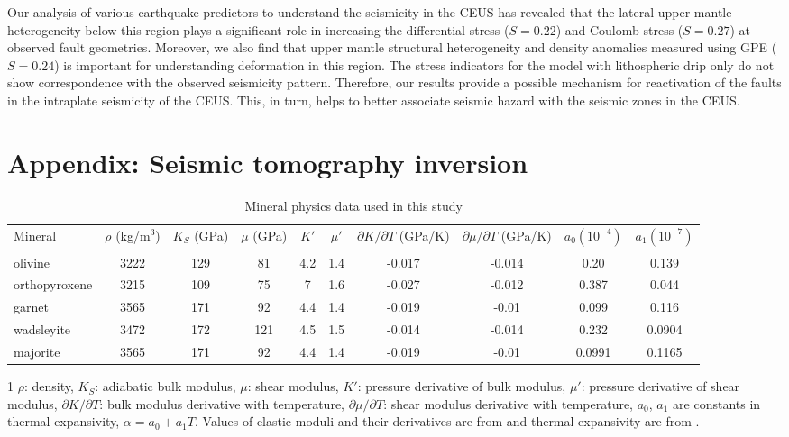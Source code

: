 \documentclass[draft,linenumbers]{agujournal2018}
\begin{document}
Our analysis of various earthquake predictors to understand the seismicity in the CEUS has revealed that the lateral upper-mantle heterogeneity below this region plays a significant role in increasing the differential stress ($S=0.22$) and Coulomb stress ($S=0.27$) at observed fault geometries. Moreover, we also find that upper mantle structural heterogeneity and density anomalies measured using GPE ($S=0.24$) is important for understanding deformation in this region. The stress indicators for the model with lithospheric drip only do not show correspondence with the observed seismicity pattern. Therefore, our results provide a possible mechanism for reactivation of the faults in the intraplate seismicity of the CEUS. This, in turn, helps to better associate seismic hazard with the seismic zones in the CEUS.

\appendix
\section{Appendix: Seismic tomography inversion}


\begin{table}
\caption{Mineral physics data used in this study }
\centering
\begin{tabular}{ l c c c c c c c c c } 
\hline
 \multirow{2}{3em}{Mineral} & \multirow{2}{3em}{$\rho$ (kg/m$^3$)} & \multirow{2}{3em}{$K_S$ (GPa)} & \multirow{2}{3em}{$\mu$  (GPa)}  & $K'$ & $\mu'$ &  \multirow{2}{4em}{$\partial K/\partial T$ (GPa/K)}  & \multirow{2}{4em}{$\partial \mu/\partial T$ (GPa/K)} & \multirow{2}{4em}{$a_0 (10^{-4})$} & \multirow{2}{4em}{$a_1 (10^{-7})$} \\ & & & & & & & & & \\
 \hline
  olivine  & 3222 & 129 &  81 & 4.2 & 1.4 & -0.017 & -0.014 & 0.20 &  0.139  \\
  orthopyroxene  & 3215 &  109 &  75 & 7 & 1.6 & -0.027 & -0.012 & 0.387 & 0.044 \\
  garnet  &  3565 & 171 & 92 & 4.4 & 1.4 & -0.019 & -0.01 & 0.099 & 0.116 \\
  wadsleyite  & 3472 & 172 & 121 & 4.5 & 1.5 & -0.014 & -0.014 & 0.232 &  0.0904 \\
  majorite  &  3565  & 171 & 92 & 4.4 & 1.4 & -0.019 & -0.01 &  0.0991 & 0.1165   \\
\hline
\end{tabular}
  \begin{tablenotes}
  \begin {small}
     \item[1] $\rho$: density, $K_S$: adiabatic bulk modulus, $\mu$: shear modulus, $K'$: pressure derivative of bulk modulus, $\mu'$: pressure derivative of shear modulus, $\partial K/\partial T$: bulk modulus derivative with temperature, $\partial \mu/\partial T$: shear modulus derivative with temperature, $a_0$, $a_1$ are constants in thermal expansivity, $\alpha = a_0 + a_1 T$. Values of elastic moduli and their derivatives are from \citet{Cammarano2003} and thermal expansivity are from \citet{saxena_data}.
     \end{small}
  \end{tablenotes}
 \label{table1}
\end{table}
\end{document}
